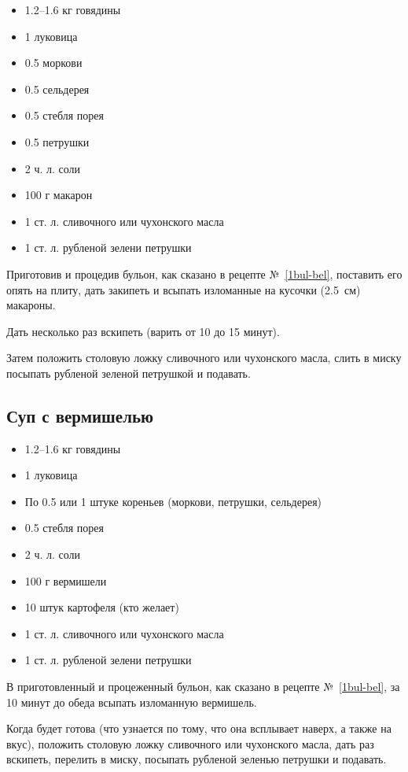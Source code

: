 \begin{itemize}
	\item 1.2–1.6 кг говядины 
	\item 1 луковица 
	\item 0.5 моркови 
	\item 0.5 сельдерея 
	\item 0.5 стебля порея 
	\item 0.5 петрушки 
	\item 2 ч. л. соли 
	\item 100 г макарон 
	\item 1 ст. л. сливочного или чухонского масла 
	\item 1 ст. л. рубленой зелени петрушки 
\end{itemize}

Приготовив и процедив бульон, как сказано в рецепте №~\ref{1bul-bel}, поставить его опять на плиту, дать закипеть и всыпать изломанные на кусочки (2.5~см) макароны.

Дать несколько раз вскипеть (варить от 10 до 15 минут).

Затем положить столовую ложку сливочного или чухонского масла, слить в миску посыпать рубленой зеленой петрушкой и подавать.

\subsection{Суп с вермишелью}\label{15sup-vermish}

\begin{itemize}
	\item 1.2–1.6 кг говядины 
	\item 1 луковица 
	\item По 0.5 или 1 штуке кореньев (моркови, петрушки, сельдерея) 
	\item 0.5 стебля порея 
	\item 2 ч. л. соли 
	\item 100 г вермишели 
	\item 10 штук картофеля (кто желает) 
	\item 1 ст. л. сливочного или чухонского масла 
	\item 1 ст. л. рубленой зелени петрушки 
\end{itemize}

В приготовленный и процеженный бульон, как сказано в рецепте №~\ref{1bul-bel}, за 10 минут до обеда всыпать изломанную вермишель.

Когда будет готова (что узнается по тому, что она всплывает наверх, а также на вкус), положить столовую ложку сливочного или чухонского масла, дать раз вскипеть, перелить в миску, посыпать рубленой зеленью петрушки и подавать.

